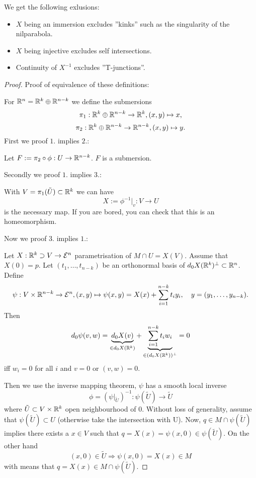 \begin{remark} We get the following exlusions:	
	\begin{itemize}
		\item $X$ being an immersion excludes ''kinks'' such as the singularity of the nilparabola.
		\item $X$ being injective excludes self intersections.
		\item Continuity of $X^{-1}$ excludes ''T-junctions''.
	\end{itemize}
\end{remark}

\begin{proof}
	Proof of equivalence of these definitions:
	
	For $\mathbb R^n = \mathbb R^k \oplus \mathbb R^{n-k}$ we define the submersions
		\[ \pi_1: \mathbb R^k \oplus \mathbb R^{n-k} \to \mathbb R^k, (x,y) \mapsto x, \]
		\[ \pi_2: \mathbb R^k \oplus \mathbb R^{n-k} \to \mathbb R^{n-k}, (x,y) \mapsto y. \]
	First we proof $1.$ implies $2.$:
	
	Let $F:= \pi_2 \circ \phi: U \to \mathbb R^{n-k}$. $F$ is a submersion.
	
	Secondly we proof $1.$ implies $3.$:
	
	With $V= \pi_1(\tilde U) \subset \mathbb R^k$ we can have
		\[ X:= \phi^{-1}\big|_v: V \to U \]
	is the necessary map.
	If you are bored, you can check that this is an homeomorphism.
	
	Now we proof $3.$ implies $1.$:
	
	Let $X: \mathbb R^k \supset V \to \mathcal E^n$ parametrisation of $M \cap U = X(V)$. Assume that $X(0)= p$. Let $(t_1, \ldots,t_{n-k})$ be an orthonormal basis of $d_0X(\mathbb R^k)^\perp \subset \mathbb R^n$. Define
		\[ \psi: V \times \mathbb R^{n-k} \to \mathcal E^n, (x,y) \mapsto \psi(x,y)= X(x)+ \sum_{i=1}^{n-k} t_iy_i, \quad y=(y_1,\ldots,y_{n-k}). \]
	Then 
		\[ d_0\psi(v,w) = \underbrace{d_0X(v)}_{\in d_0X(\mathbb R^k)} + \underbrace{\sum_{i=1}^{n-k} t_i w_i}_{\in (d_0X(\mathbb R^k))^\perp} = 0 \]
	iff $w_i=0$ for all $i$ and $v=0$ or $(v,w)=0$. 
	
	Then we use the inverse mapping theorem, $\psi$ has a smooth local inverse
		\[ \phi=(\psi\big|_{\tilde U})^{-1}: \psi(\tilde U) \to \tilde U \]
	where $\tilde U \subset V \times \mathbb R^k$ open neighbourhood of $0$. Without loss of generality, assume that $\psi(\tilde U) \subset U$ (otherwise take the intersection with U).
	Now, $q \in M \cap \psi(\tilde U)$ implies there exists a $x \in V$ such that $q= X(x)= \psi(x,0) \in \psi(\tilde U)$. On the other hand 
		\[ (x,0) \in \tilde U \Rightarrow \psi(x,0) = X(x) \in M \]
	with means that $q=X(x) \in M \cap \psi(\tilde U)$.
	

\end{proof}

